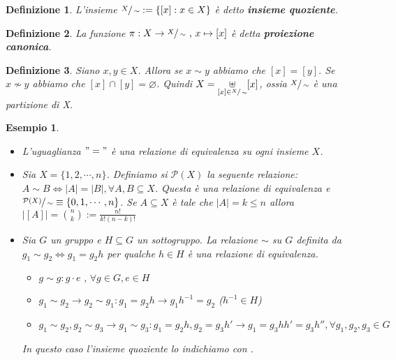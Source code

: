 \documentclass[a4paper,12pt]{article}
\theoremstyle{def}
\newtheorem*{definition}{Definizione}
\theoremstyle{prop}
\theoremstyle{esempio}
\newtheorem*{example}{Esempio}
\theoremstyle{dimostrazione}
\theoremstyle{teo}
\theoremstyle{osservazione}
\begin{document}
\begin{definition}
	L'insieme \(\sfrac{X}{\sim} := \{[x] : x \in X\}\) è detto \textbf{insieme quoziente}.
\end{definition}

\begin{definition}
	La funzione \begin{math}
		\pi : X \rightarrow \sfrac{X}{\sim} \text{ , } x \mapsto [x] \end{math} è detta \textbf{proiezione canonica}.
\end{definition}

\begin{definition}
	Siano \(x,y \in X\). Allora se \(x \sim y\) abbiamo che \([x] = [y]\).
	Se \(x \nsim y\) abbiamo che \([x] \cap [y] = \varnothing\).
	Quindi \(X = \underset{[x] \in \sfrac{X}{\sim}}{\uplus} [x]\), ossia \(\sfrac{X}{\sim}\) è una partizione di X.
\end{definition}

\begin{example}
	\
	\begin{itemize}
		\item L'uguaglianza \("="\) è una relazione di equivalenza
		      su ogni insieme \(X\).
		\item Sia \(X = \{1,2,\cdots,n\}\). Definiamo si \(\mathcal{P}(X)\)
		      la seguente relazione:
		      \(A \sim B \Leftrightarrow |A| = |B|, \forall A,B \subseteq X\).
		      Questa è una relazione di equivalenza e \(\sfrac{\mathcal{P}(X)}{\sim}
		      \equiv \{0,1,\cdots,n\}\). Se \(A \subseteq X\) è tale che
		      \(|A| = k \leq n\) allora \(|[A]| = \binom{n}{k} := \frac{n!}{k!(n-k)!}\)
		\item Sia \(G\) un gruppo e \(H \subseteq G\) un sottogruppo. La relazione
		      \(\sim \) su \(G\) definita da \(g_1 \sim g_2 \Leftrightarrow g_1=g_2 h\)
		      per qualche \(h \in H\) è una relazione di equivalenza.\
		      \begin{itemize}
			      \item \(g \sim g : g \cdot e \text{ , } \forall g \in G , e \in H\)
			      \item \(g_1 \sim g_2 \rightarrow g_2 \sim g_1 : g_1 = g_2 h \rightarrow
			            g_1 h^{-1} = g_2\) (\(h^{-1} \in H\))
			      \item \(g_1 \sim g_2 , g_2 \sim g_3 \rightarrow g_1 \sim g_3 :
			            g_1 = g_2 h, g_2 = g_3 h' \rightarrow g_1 = g_3 h h' = g_3 h''
			            , \forall g_1,g_2,g_3 \in G\)
		      \end{itemize}
		      In questo caso l'insieme quoziente lo indichiamo con .
		      
	\end{itemize}
\end{example}
\end{document}

